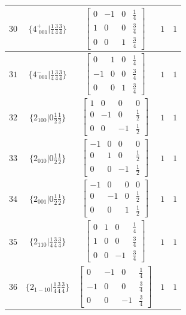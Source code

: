 \documentclass[fleqn,8pt]{jsarticle}
\begin{document}
\begin{longtable}{ccccc}
$ 30 $ & $ \{4^{+}_{\,\,001}|\frac{1}{4} \frac{3}{4} \frac{3}{4}\} $ & $ \begin{bmatrix} 0 & -1 & 0 & \frac{1}{4} \\ 1 & 0 & 0 & \frac{3}{4} \\ 0 & 0 & 1 & \frac{3}{4} \end{bmatrix} $ & $ 1 $ & $ 1 $ \\ \hline
$ 31 $ & $ \{4^{-}_{\,\,001}|\frac{1}{4} \frac{3}{4} \frac{3}{4}\} $ & $ \begin{bmatrix} 0 & 1 & 0 & \frac{1}{4} \\ -1 & 0 & 0 & \frac{3}{4} \\ 0 & 0 & 1 & \frac{3}{4} \end{bmatrix} $ & $ 1 $ & $ 1 $ \\ \hline
$ 32 $ & $ \{2{}_{100}|0 \frac{1}{2} \frac{1}{2}\} $ & $ \begin{bmatrix} 1 & 0 & 0 & 0 \\ 0 & -1 & 0 & \frac{1}{2} \\ 0 & 0 & -1 & \frac{1}{2} \end{bmatrix} $ & $ 1 $ & $ 1 $ \\ \hline
$ 33 $ & $ \{2{}_{010}|0 \frac{1}{2} \frac{1}{2}\} $ & $ \begin{bmatrix} -1 & 0 & 0 & 0 \\ 0 & 1 & 0 & \frac{1}{2} \\ 0 & 0 & -1 & \frac{1}{2} \end{bmatrix} $ & $ 1 $ & $ 1 $ \\ \hline
$ 34 $ & $ \{2{}_{001}|0 \frac{1}{2} \frac{1}{2}\} $ & $ \begin{bmatrix} -1 & 0 & 0 & 0 \\ 0 & -1 & 0 & \frac{1}{2} \\ 0 & 0 & 1 & \frac{1}{2} \end{bmatrix} $ & $ 1 $ & $ 1 $ \\ \hline
$ 35 $ & $ \{2{}_{110}|\frac{1}{4} \frac{3}{4} \frac{3}{4}\} $ & $ \begin{bmatrix} 0 & 1 & 0 & \frac{1}{4} \\ 1 & 0 & 0 & \frac{3}{4} \\ 0 & 0 & -1 & \frac{3}{4} \end{bmatrix} $ & $ 1 $ & $ 1 $ \\ \hline
$ 36 $ & $ \{2{}_{1-10}|\frac{1}{4} \frac{3}{4} \frac{3}{4}\} $ & $ \begin{bmatrix} 0 & -1 & 0 & \frac{1}{4} \\ -1 & 0 & 0 & \frac{3}{4} \\ 0 & 0 & -1 & \frac{3}{4} \end{bmatrix} $ & $ 1 $ & $ 1 $ \\ \hline

\end{longtable}
\end{document}
